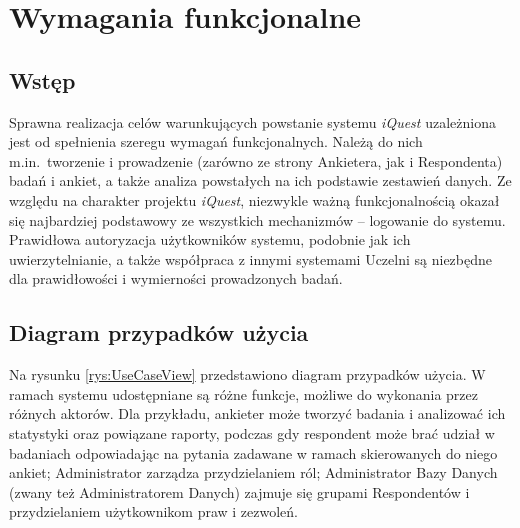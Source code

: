 \chapter{Wymagania funkcjonalne}
\label{Chapter3}

\section{Wstęp}
\label{Chapter31}

Sprawna realizacja celów warunkujących powstanie systemu \textit{iQuest} uzależniona jest od spełnienia szeregu wymagań funkcjonalnych. Należą do nich m.in.~tworzenie i prowadzenie (zarówno ze strony Ankietera, jak i Respondenta) badań i ankiet, a także analiza powstałych na ich podstawie zestawień danych. Ze względu na charakter projektu \textit{iQuest}, niezwykle ważną funkcjonalnością okazał się najbardziej podstawowy ze wszystkich mechanizmów -- logowanie do systemu. Prawidłowa autoryzacja użytkowników systemu, podobnie jak ich uwierzytelnianie, a także współpraca z innymi systemami Uczelni są niezbędne dla prawidłowości i wymierności prowadzonych badań.

\section{Diagram przypadków użycia}
\label{Chapter32}

Na rysunku \ref{rys:UseCaseView} przedstawiono diagram przypadków użycia. W ramach systemu udostępniane są różne funkcje, możliwe do wykonania przez różnych aktorów. Dla przykładu, ankieter może tworzyć badania i analizować ich statystyki oraz powiązane raporty, podczas gdy respondent może brać udział w badaniach odpowiadając na pytania zadawane w ramach skierowanych do niego ankiet; Administrator zarządza przydzielaniem ról; Administrator Bazy Danych (zwany też Administratorem Danych) zajmuje się grupami Respondentów i przydzielaniem użytkownikom praw i zezwoleń.

